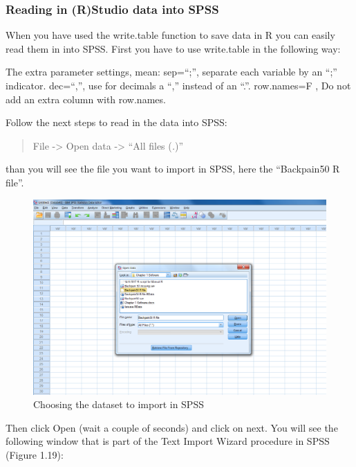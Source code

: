 \documentclass[]{book}
\theoremstyle{definition}
\theoremstyle{definition}
\theoremstyle{definition}
\theoremstyle{remark}
\begin{document}
\subsubsection{Reading in (R)Studio data into
SPSS}\label{reading-in-rstudio-data-into-spss}

When you have used the write.table function to save data in R you can
easily read them in into SPSS. First you have to use write.table in the
following way:

The extra parameter settings, mean: sep=``;'', separate each variable by
an ``;'' indicator. dec=``,'', use for decimals a ``,'' instead of an
``.''. row.names=F , Do not add an extra column with row.names.

Follow the next steps to read in the data into SPSS:

\begin{quote}
File -\textgreater{} Open data -\textgreater{} ``All files (\emph{.})''
\end{quote}

than you will see the file you want to import in SPSS, here the
``Backpain50 R file''.

\begin{figure}

{\centering \includegraphics[width=0.8\linewidth]{images/fig1.18} 

}

\caption{Choosing the dataset to import in SPSS}\label{fig:fig18}
\end{figure}

Then click Open (wait a couple of seconds) and click on next. You will
see the following window that is part of the Text Import Wizard
procedure in SPSS (Figure 1.19):
\end{document}
